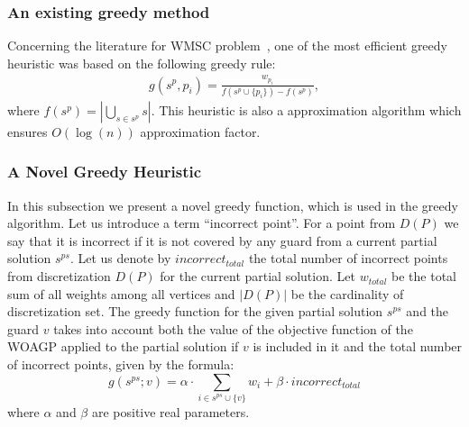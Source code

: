 \documentclass[runningheads,a4paper]{elsarticle}
\begin{document}
	\subsubsection{An existing greedy method}
	
	Concerning the literature for WMSC problem~\cite{chvatal1979greedy, lovasz1975ratio}, one of the most efficient greedy heuristic was based on the following greedy rule:
	\begin{align}
	g(s^p, p_i) = \frac{w_{p_i}}{ f(s^p \cup \{p_i\})  - f(s^p)},
	\end{align}
	where $f(s^p) = |\bigcup_{s \in s^p} s |$.
	This heuristic is also a approximation algorithm which ensures $O(\log(n))$ approximation factor.
	
	\subsubsection{A Novel Greedy Heuristic}
	In this subsection we present a novel greedy function, which is used in the greedy algorithm. Let us introduce a term  ``incorrect point''. For a point from $D(P)$ we say that it is incorrect if it is not covered by any guard from a current partial solution $s^{ps}$. Let us denote by $incorrect_{total}$ the total number of incorrect points from discretization $D(P)$ for the current partial solution.  Let $w_{total}$ be the total sum of all weights among all vertices and $|D(P)|$ be the cardinality of discretization set. The greedy function for the given partial solution $s^{ps}$ and the guard $v$ takes into account both the value of the objective function of the WOAGP  applied to the partial solution if $v$ is included in it and the total number of incorrect points, given by the formula:
	\begin{equation}\label{eq:greedyfun2}
	g(s^{ps}; v) = \alpha \cdot \sum_{i \in s^{ps} \cup \{v\}} w_i+ \beta \cdot {incorrect_{total}}
	\end{equation}
	where $\alpha$ and $\beta$ are positive real parameters.
	
\end{document}
